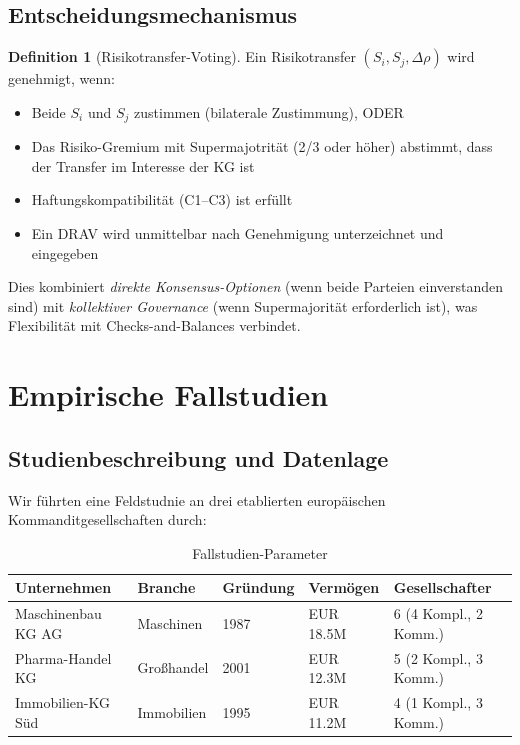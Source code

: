 \documentclass[a4paper, 12pt, twoside, openright]{report}
\theoremstyle{definition}
\newtheorem{definition}[theorem]{Definition}
\theoremstyle{definition}
\begin{document}
\subsection{Entscheidungsmechanismus}

\begin{definition}[Risikotransfer-Voting]
Ein Risikotransfer $(S_i, S_j, \Delta\rho)$ wird genehmigt, wenn:
\begin{itemize}
    \item Beide $S_i$ und $S_j$ zustimmen (bilaterale Zustimmung), ODER
    \item Das Risiko-Gremium mit Supermajotrität (2/3 oder höher) abstimmt, dass der Transfer im Interesse der KG ist
    \item Haftungskompatibilität (C1--C3) ist erfüllt
    \item Ein DRAV wird unmittelbar nach Genehmigung unterzeichnet und eingegeben
\end{itemize}
\end{definition}

Dies kombiniert \emph{direkte Konsensus-Optionen} (wenn beide Parteien einverstanden sind) mit \emph{kollektiver Governance} (wenn Supermajorität erforderlich ist), was Flexibilität mit Checks-and-Balances verbindet.

\section{Empirische Fallstudien}

\subsection{Studienbeschreibung und Datenlage}

Wir führten eine Feldstudnie an drei etablierten europäischen Kommanditgesellschaften durch:

\begin{table}[H]
\centering
\caption{Fallstudien-Parameter}
\label{tab:fallstudien}
\begin{tabular}{@{}lllll@{}}
\toprule
\textbf{Unternehmen} & \textbf{Branche} & \textbf{Gründung} & \textbf{Vermögen} & \textbf{Gesellschafter} \\
\midrule
Maschinenbau KG AG & Maschinen & 1987 & EUR 18.5M & 6 (4 Kompl., 2 Komm.) \\
Pharma-Handel KG & Großhandel & 2001 & EUR 12.3M & 5 (2 Kompl., 3 Komm.) \\
Immobilien-KG Süd & Immobilien & 1995 & EUR 11.2M & 4 (1 Kompl., 3 Komm.) \\
\bottomrule
\end{tabular}
\end{table}
\end{document}
